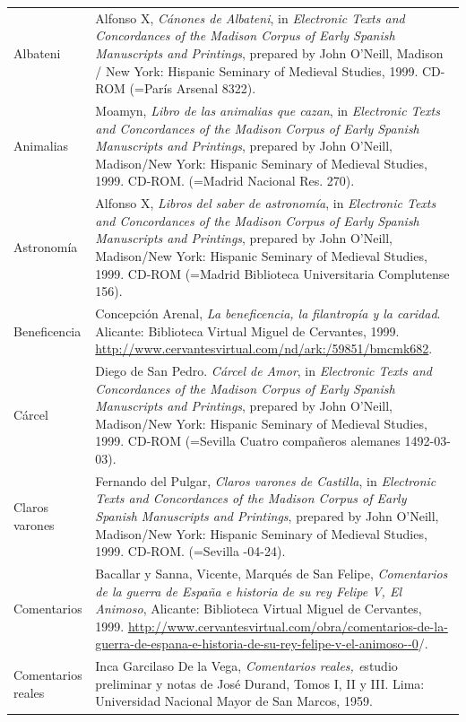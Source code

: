 \begin{tabularx}{\textwidth}{XX}
\lsptoprule
Albateni & Alfonso X, \textit{Cánones de Albateni}, in \textit{Electronic Texts and Concordances of the Madison Corpus of Early Spanish Manuscripts and Printings}, prepared by John O’Neill, Madison / New York: Hispanic Seminary of Medieval Studies, 1999. CD-ROM (=París Arsenal 8322).\\
Animalias & Moamyn, \textit{Libro de las animalias que cazan}, in \textit{Electronic Texts and Concordances of the Madison Corpus of Early Spanish Manuscripts and Printings}, prepared by John O’Neill, Madison/New York: Hispanic Seminary of Medieval Studies, 1999. CD-ROM. (=Madrid Nacional Res. 270). \\
Astronomía & Alfonso X, \textit{Libros del saber de astronomía}, in \textit{Electronic Texts and Concordances of the Madison Corpus of Early Spanish Manuscripts and Printings}, prepared by John O’Neill, Madison/New York: Hispanic Seminary of Medieval Studies, 1999. CD-ROM (=Madrid Biblioteca Universitaria Complutense 156).\\
Beneficencia & Concepción Arenal, \textit{La beneficencia, la filantropía y la caridad}. Alicante: Biblioteca Virtual Miguel de Cervantes, 1999. \url{http://www.cervantesvirtual.com/nd/ark:/59851/bmcmk682}. \\
Cárcel  & Diego de San Pedro. \textit{Cárcel de Amor}, in \textit{Electronic Texts and Concordances of the Madison Corpus of Early Spanish Manuscripts and Printings}, prepared by John O’Neill, Madison/New York: Hispanic Seminary of Medieval Studies, 1999. CD-ROM (=Sevilla Cuatro compañeros alemanes 1492-03-03).\\
Claros varones  & Fernando del Pulgar, \textit{Claros varones de Castilla}, in \textit{Electronic Texts and Concordances of the Madison Corpus of Early Spanish Manuscripts and Printings}, prepared by John O’Neill, Madison/New York: Hispanic Seminary of Medieval Studies, 1999. CD-ROM. (=Sevilla \citealt{Polono1500}-04-24).\\
Comentarios  & Bacallar y Sanna, Vicente, Marqués de San Felipe, \textit{Comentarios de la guerra de España e historia de su rey Felipe V, El Animoso}, Alicante: Biblioteca Virtual Miguel de Cervantes, 1999. \href{http://www.cervantesvirtual.com/obra/comentarios-de-la-guerra-de-espana-e-historia-de-su-rey-felipe-v-el-animoso--0/}{{http://www.cervantesvirtual.com/obra/comentarios-de-la-guerra-de-espana-e-historia-de-su-rey-felipe-v-el-animoso-{}-0}}/.\\
Comentarios reales & Inca Garcilaso De la Vega, \emph{{\textit{Comentarios reales,}}{} {e}}studio preliminar y notas de José Durand, Tomos I, II y III. Lima: Universidad Nacional Mayor de San Marcos, 1959.\\

\end{tabularx}

